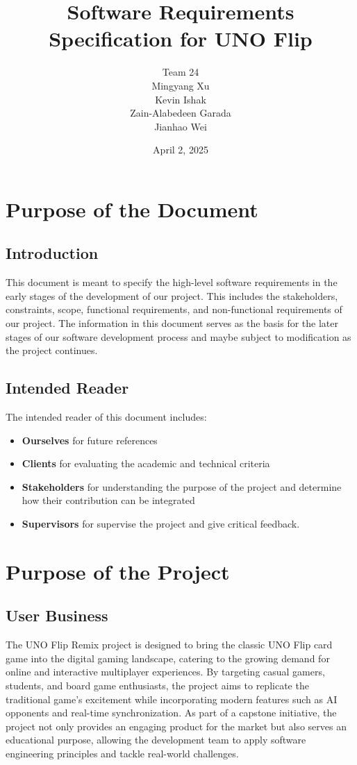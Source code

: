 \documentclass[12pt]{article}
\title{Software Requirements Specification for UNO Flip}
\author{Team 24 \\ Mingyang Xu \\ Kevin Ishak \\ Zain-Alabedeen Garada \\ Jianhao Wei \\ \removed{Andy Liang}}
\date{April 2, 2025}
\begin{document}
\maketitle

\tableofcontents

\section{Purpose of the Document}

\subsection{Introduction}
This document is meant to specify the high-level software requirements in the early stages of the development of our project. This includes the stakeholders, constraints, scope, functional requirements, and non-functional requirements of our project. The information in this document serves as the basis for the later stages of our software development process and maybe subject to modification as the project continues.

\subsection{Intended Reader}
The intended reader of this document includes:
\begin{itemize}
    \item \textbf{Ourselves} for future references
    \item \textbf{Clients} for evaluating the academic and technical criteria
    \item \textbf{Stakeholders} for understanding the purpose of the project and determine how their contribution can be integrated
    \item \textbf{Supervisors} for supervise the project and give critical feedback.
\end{itemize}

\section{Purpose of the Project}

\subsection{User Business}
The UNO Flip Remix project is designed to bring the classic UNO Flip card game into the digital gaming landscape, catering to the growing demand for online and interactive multiplayer experiences. By targeting casual gamers, students, and board game enthusiasts, the project aims to replicate the traditional game's excitement while incorporating modern features such as AI opponents and real-time synchronization. As part of a capstone initiative, the project not only provides an engaging product for the market but also serves an educational purpose, allowing the development team to apply software engineering principles and tackle real-world challenges.
\end{document}
